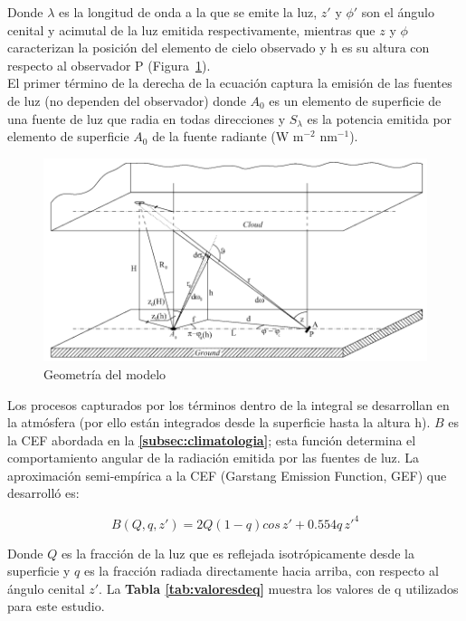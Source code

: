 Donde $\lambda$ es la longitud de onda a la que se emite la luz, $z'$ y $\phi'$ son el ángulo cenital y acimutal de la luz emitida respectivamente, mientras que $z$ y $\phi$ caracterizan la posición del elemento de cielo observado y h es su altura con respecto al observador P (Figura~\ref{geometriamodelo}).\\

El primer término de la derecha de la ecuación captura la emisión de las fuentes de luz (no dependen del observador) donde $A_{0}$ es un elemento de superficie de una fuente de luz que radia en todas direcciones y $S_{\lambda}$ es la potencia emitida por elemento de superficie $A_{0}$ de la fuente radiante (W m$^{-2}$ nm$^{-1}$).\\


\begin{figure}[htb]
  \centering
    \includegraphics[width=1\textwidth]{geometriamodelo}
  \caption{Geometría del modelo \citep{Kocifaj2007}}
  \label{geometriamodelo}
\end{figure}


Los procesos capturados por los términos dentro de la integral se desarrollan en la atmósfera (por ello están integrados desde la superficie hasta la altura h). $B$ es la CEF abordada en la \textbf{\autoref{subsec:climatologia}}; esta función determina el comportamiento angular de la radiación emitida por las fuentes de luz. La aproximación semi-empírica a la CEF (Garstang Emission Function, GEF) que \cite{Garstang1986} desarrolló es:

\begin{equation}
B(Q, q, z') = 2Q(1-q) cos \, z' + 0.554q \,z'^{4}
\end{equation}

Donde $Q$ es la fracción de la luz que es reflejada isotrópicamente desde la superficie y $q$ es la fracción radiada directamente hacia arriba, con respecto al ángulo cenital $z'$. La \textbf{Tabla \ref{tab:valoresdeq}} muestra los valores de q utilizados para este estudio.\\



